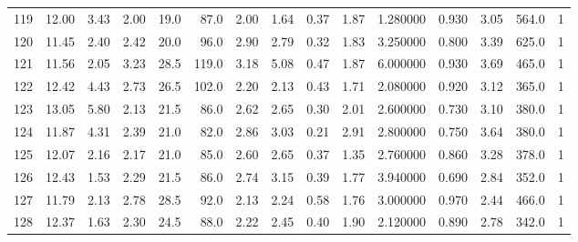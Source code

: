 \documentclass{article}
\begin{document}
\begin{tabular}{lrrrrrrrrrrrrrr}
    119 &    12.00 &        3.43 &  2.00 &               19.0 &       87.0 &           2.00 &        1.64 &                  0.37 &             1.87 &         1.280000 &  0.930 &                          3.05 &    564.0 &      1 \\
    120 &    11.45 &        2.40 &  2.42 &               20.0 &       96.0 &           2.90 &        2.79 &                  0.32 &             1.83 &         3.250000 &  0.800 &                          3.39 &    625.0 &      1 \\
    121 &    11.56 &        2.05 &  3.23 &               28.5 &      119.0 &           3.18 &        5.08 &                  0.47 &             1.87 &         6.000000 &  0.930 &                          3.69 &    465.0 &      1 \\
    122 &    12.42 &        4.43 &  2.73 &               26.5 &      102.0 &           2.20 &        2.13 &                  0.43 &             1.71 &         2.080000 &  0.920 &                          3.12 &    365.0 &      1 \\
    123 &    13.05 &        5.80 &  2.13 &               21.5 &       86.0 &           2.62 &        2.65 &                  0.30 &             2.01 &         2.600000 &  0.730 &                          3.10 &    380.0 &      1 \\
    124 &    11.87 &        4.31 &  2.39 &               21.0 &       82.0 &           2.86 &        3.03 &                  0.21 &             2.91 &         2.800000 &  0.750 &                          3.64 &    380.0 &      1 \\
    125 &    12.07 &        2.16 &  2.17 &               21.0 &       85.0 &           2.60 &        2.65 &                  0.37 &             1.35 &         2.760000 &  0.860 &                          3.28 &    378.0 &      1 \\
    126 &    12.43 &        1.53 &  2.29 &               21.5 &       86.0 &           2.74 &        3.15 &                  0.39 &             1.77 &         3.940000 &  0.690 &                          2.84 &    352.0 &      1 \\
    127 &    11.79 &        2.13 &  2.78 &               28.5 &       92.0 &           2.13 &        2.24 &                  0.58 &             1.76 &         3.000000 &  0.970 &                          2.44 &    466.0 &      1 \\
    128 &    12.37 &        1.63 &  2.30 &               24.5 &       88.0 &           2.22 &        2.45 &                  0.40 &             1.90 &         2.120000 &  0.890 &                          2.78 &    342.0 &      1 \\

\end{tabular}
\end{document}
